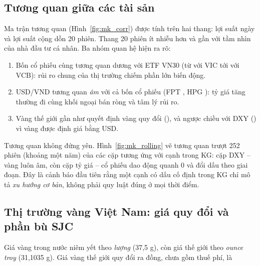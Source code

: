 
\subsection{Tương quan giữa các tài sản}
Ma trận tương quan (Hình~\ref{fig:mk_corr}) được tính trên hai thang: lợi suất ngày và lợi suất cộng dồn 20 phiên.
Thang 20 phiên ít nhiễu hơn và gần với tầm nhìn của nhà đầu tư cá nhân. Ba nhóm quan hệ hiện ra rõ:

\begin{enumerate}
  \item Bốn cổ phiếu cùng tương quan dương với ETF VN30 (từ  với VIC tới
         với VCB): rủi ro chung của thị trường chiếm phần lớn biến động.
  \item USD/VND tương quan \emph{âm} với cả bốn cổ phiếu (FPT , HPG
        ): tỷ giá tăng thường đi cùng khối ngoại bán ròng và tâm lý rủi ro.
  \item Vàng thế giới gần như quyết định vàng quy đổi (), và ngược chiều với DXY
        () vì vàng được định giá bằng USD.
\end{enumerate}


Tương quan không đứng yên. Hình~\ref{fig:mk_rolling} vẽ tương quan trượt 252 phiên (khoảng một năm) của các cặp
tương ứng với cạnh trong KG: cặp DXY -- vàng luôn âm, còn cặp tỷ giá -- cổ phiếu dao động quanh 0 và đổi dấu theo
giai đoạn. Đây là cảnh báo đầu tiên rằng một cạnh có dấu cố định trong KG chỉ mô tả \emph{xu hướng cơ bản}, không
phải quy luật đúng ở mọi thời điểm.


\subsection{Thị trường vàng Việt Nam: giá quy đổi và phần bù SJC}\label{sec:vang}
Giá vàng trong nước niêm yết theo \emph{lượng} (37,5 g), còn giá thế giới theo \emph{ounce troy} (31,1035 g). Giá
vàng thế giới quy đổi ra đồng, chưa gồm thuế phí, là

